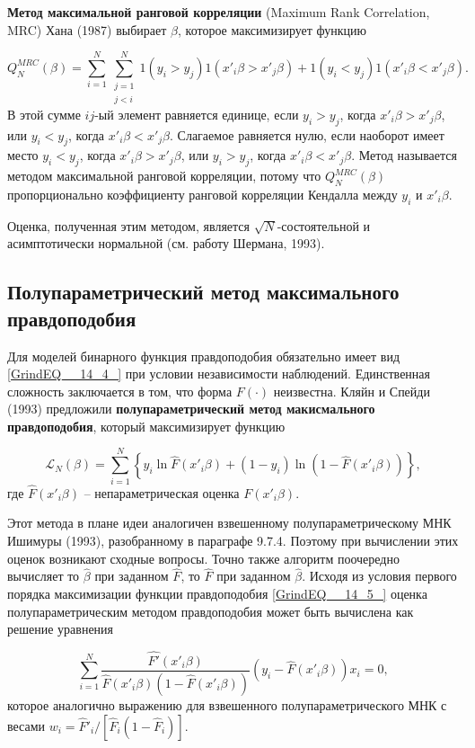 \textbf{Метод максимальной ранговой корреляции} (Maximum Rank Correlation, MRC) Хана (1987) выбирает $\beta$,  которое максимизирует функцию

\[
Q^{MRC}_N(\beta) = \sum^N_{i=1} \sum^N_{\begin{array}{c} j=1 \\ j < i \end{array}} 
1(y_i > y_j) 1(x'_i\beta > x'_j\beta) + 1(y_i < y_j) 1(x'_i\beta < x'_j\beta).
\] 
В этой сумме $ij$-ый элемент равняется единице,  если $y_i>y_j$,  когда $x'_i\beta > x'_j\beta $,  или $y_i < y_j$,  когда $x'_i\beta < x'_j\beta $.  Слагаемое равняется нулю,  если наоборот имеет место $y_i < y_j$,  когда $x'_i\beta > x'_j\beta $,  или $y_i > y_j$,  когда $x'_i\beta < x'_j\beta $. Метод называется методом максимальной ранговой корреляции,  потому что $Q^{MRC}_N(\beta)$ пропорционально коэффициенту ранговой корреляции Кендалла между $y_i$ и $x'_i\beta $.

Оценка, полученная этим методом, является $\sqrt{N}$-состоятельной и асимптотически нормальной (см. работу Шермана, 1993). 

\subsection{Полупараметрический метод максимального правдоподобия}

Для моделей бинарного  функция правдоподобия обязательно имеет вид \eqref{GrindEQ__14_4_} при условии  независимости наблюдений. Единственная сложность заключается в том,  что форма $F\left(\cdot \right)$ неизвестна. Кляйн и Спейди (1993) предложили \textbf{полупараметрический метод макисмального правдоподобия},  который максимизирует функцию 

\[
\mathcal{L}_N(\beta) = \sum^N_{i=1} \left\{y_i \ln \hat{F}(x'_i\beta) + (1-y_i) \ln (1-\hat{F}(x'_i\beta)) \right\},
\] 
где $\hat{F}(x'_i\beta)$ -- непараметрическая оценка $F(x'_i\beta)$.

Этот метода в плане идеи аналогичен взвешенному полупараметрическому МНК Ишимуры (1993),  разобранному в параграфе 9.7.4. Поэтому при вычислении этих оценок возникают сходные вопросы. Точно также алгоритм поочередно  вычисляет то $\widehat\beta$ при заданном $\hat{F}$, то $\hat{F}$ при заданном $\widehat\beta.$ Исходя из условия первого порядка максимизации функции правдоподобия \eqref{GrindEQ__14_5_} оценка полупараметрическим методом правдоподобия может быть вычислена как решение уравнения 

\[
\sum^N_{i=1} \frac{\widehat{F'}(x'_i\beta)}{\hat{F}(x'_i\beta)(1-\hat{F}(x'_i\beta))} (y_i-\hat{F}(x'_i\beta))x_i=0, 
\] 
которое аналогично выражению для взвешенного полупараметрического МНК с весами $w_i=\hat{F}'_i/[\hat{F}_i (1-\hat{F}_i)].$

